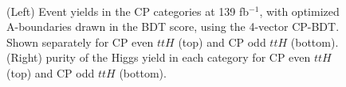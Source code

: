 \begin{figure}[htbp]
 \centering
	 \\
  \caption{(Left) Event yields in the CP categories at 139 fb$^{-1}$, with optimized A-boundaries drawn in the BDT score, using the 4-vector CP-BDT. Shown separately for CP even $ttH$ (top) and CP odd $ttH$ (bottom). (Right) purity of the Higgs yield in each category for CP even $ttH$ (top) and CP odd $ttH$ (bottom).}
  \label{fig:4vecBs}
\end{figure}  


